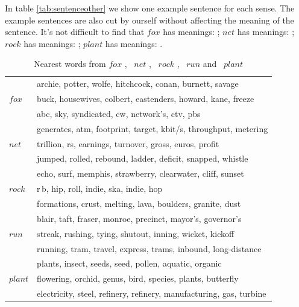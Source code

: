 In table \ref{tab:sentenceother} we show one example sentence for each sense.
The example sentences are also cut by ourself without affecting the meaning of the sentence. It's not difficult to find that $fox$ has meanings: ; $net$ has meanings: ; $rock$ has meanings: ; $plant$ has meanings: . 


\begin{table}[tb]
\caption{Nearest words from $fox$ , \ $net$ , \ $rock$ , \ $run$ and \ $plant$} \label{tab:nearestwordsother} 
\begin{center} 
\begin{tabular}{|l|l|}
\hline
\multirow{3}{*}{$fox$}   
& archie, potter, wolfe, hitchcock, conan, burnett, savage  \\ 
& buck, housewives, colbert, eastenders, howard, kane, freeze
 \\ 
& abc, sky, syndicated, cw, network's, ctv, pbs \\ 
\hline
\multirow{3}{*}{$net$}  
& generates, atm, footprint, target, kbit/s, throughput, metering   \\  
& trillion, rs, earnings, turnover, gross, euros, profit  \\  
&jumped, rolled, rebound, ladder, deficit, snapped, whistle   \\  
\hline 
\multirow{3}{*}{$rock$}  
&echo, surf, memphis, strawberry, clearwater, cliff, sunset  \\  
& r$\,$b, hip, roll, indie, ska, indie, hop  
 \\  
&formations, crust, melting, lava, boulders, granite, dust   \\  
\hline 
\multirow{3}{*}{$run$}
& blair, taft, fraser, monroe, precinct, mayor's, governor's  \\  
& streak, rushing, tying, shutout, inning, wicket, kickoff
 \\  
& running, tram, travel, express, trams, inbound, long-distance \\
\hline  
\multirow{3}{*}{$plant$}
& plants, insect, seeds, seed, pollen, aquatic, organic  \\  
& flowering, orchid, genus, bird, species, plants, butterfly
 \\  
& electricity, steel, refinery, refinery, manufacturing, gas, turbine  \\
\hline
\end{tabular}
\end{center}
\end{table}


